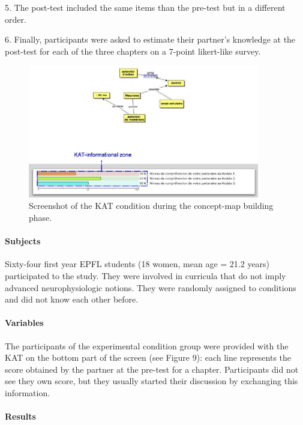 \documentclass[twocolumn]{article}
\begin{document}
5. The post-test included the same items than the pre-test but in a different
order. 

6. Finally, participants were asked to estimate their partner’s knowledge at the
post-test for each of the three chapters on a 7-point likert-like survey. 

\begin{figure}
        \centering
        \includegraphics[width=0.9\textwidth]{image11.png}
        \caption{Screenshot of the KAT condition during the concept-map building
        phase.}
        \label{study5:kat}
\end{figure}

\paragraph{Subjects}

Sixty-four first year EPFL students (18 women, mean age = 21.2 years)
participated to the study. They were involved in curricula that do not imply
advanced neurophysiologic notions. They were randomly assigned to conditions and
did not know each other before. 

\paragraph{Variables}

The participants of the experimental condition group were provided with the KAT
on the bottom part of the screen (see Figure 9): each line represents the score
obtained by the partner at the pre-test for a chapter. Participants did not see
they own score, but they usually started their discussion by exchanging this
information.

\paragraph{Results}
\end{document}
